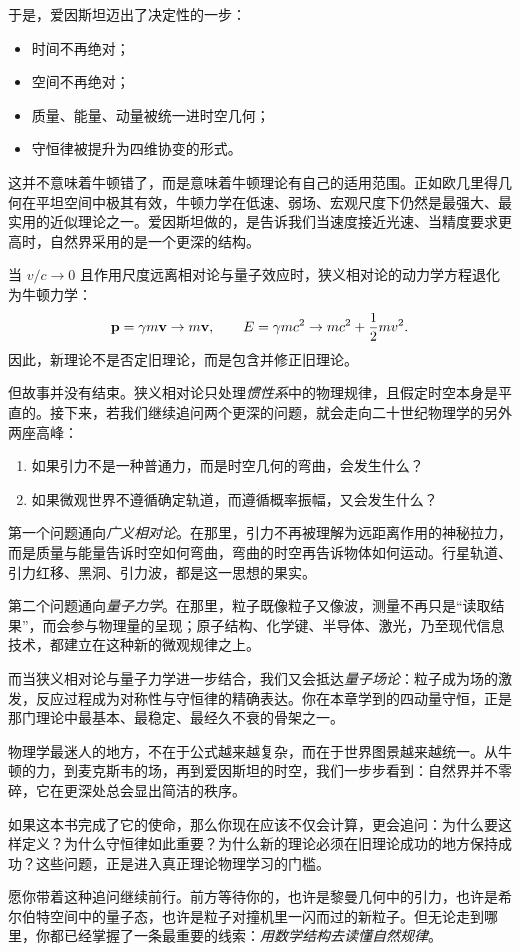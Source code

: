 于是，爱因斯坦迈出了决定性的一步：
\begin{itemize}
  \item 时间不再绝对；
  \item 空间不再绝对；
  \item 质量、能量、动量被统一进时空几何；
  \item 守恒律被提升为四维协变的形式。
\end{itemize}

这并不意味着牛顿错了，而是意味着牛顿理论有自己的适用范围。正如欧几里得几何在平坦空间中极其有效，牛顿力学在低速、弱场、宏观尺度下仍然是最强大、最实用的近似理论之一。爱因斯坦做的，是告诉我们当速度接近光速、当精度要求更高时，自然界采用的是一个更深的结构。

\begin{theorem}[经典极限原则]
当 $v/c\to 0$ 且作用尺度远离相对论与量子效应时，狭义相对论的动力学方程退化为牛顿力学：
\[
\vb{p}=\gamma m\vb{v}\to m\vb{v},
\qquad
E=\gamma mc^2 \to mc^2 + \frac12 mv^2.
\]
因此，新理论不是否定旧理论，而是包含并修正旧理论。
\end{theorem}

但故事并没有结束。狭义相对论只处理\emph{惯性系}中的物理规律，且假定时空本身是平直的。接下来，若我们继续追问两个更深的问题，就会走向二十世纪物理学的另外两座高峰：
\begin{enumerate}
  \item 如果引力不是一种普通力，而是时空几何的弯曲，会发生什么？
  \item 如果微观世界不遵循确定轨道，而遵循概率振幅，又会发生什么？
\end{enumerate}

第一个问题通向\emph{广义相对论}。在那里，引力不再被理解为远距离作用的神秘拉力，而是质量与能量告诉时空如何弯曲，弯曲的时空再告诉物体如何运动。行星轨道、引力红移、黑洞、引力波，都是这一思想的果实。

第二个问题通向\emph{量子力学}。在那里，粒子既像粒子又像波，测量不再只是“读取结果”，而会参与物理量的呈现；原子结构、化学键、半导体、激光，乃至现代信息技术，都建立在这种新的微观规律之上。

而当狭义相对论与量子力学进一步结合，我们又会抵达\emph{量子场论}：粒子成为场的激发，反应过程成为对称性与守恒律的精确表达。你在本章学到的四动量守恒，正是那门理论中最基本、最稳定、最经久不衰的骨架之一。

\begin{remark}
物理学最迷人的地方，不在于公式越来越复杂，而在于世界图景越来越统一。从牛顿的力，到麦克斯韦的场，再到爱因斯坦的时空，我们一步步看到：自然界并不零碎，它在更深处总会显出简洁的秩序。
\end{remark}

如果这本书完成了它的使命，那么你现在应该不仅会计算，更会追问：为什么要这样定义？为什么守恒律如此重要？为什么新的理论必须在旧理论成功的地方保持成功？这些问题，正是进入真正理论物理学习的门槛。

愿你带着这种追问继续前行。前方等待你的，也许是黎曼几何中的引力，也许是希尔伯特空间中的量子态，也许是粒子对撞机里一闪而过的新粒子。但无论走到哪里，你都已经掌握了一条最重要的线索：\emph{用数学结构去读懂自然规律}。

